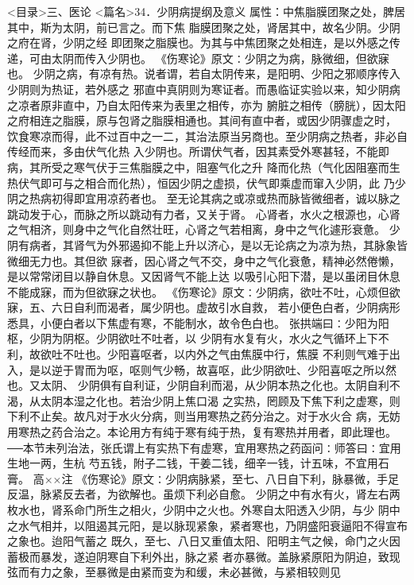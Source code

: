\documentclass[a4paper,12pt,UTF8,twoside]{ctexbook}
\begin{document}
<目录>三、医论
<篇名>34．少阴病提纲及意义
属性：中焦脂膜团聚之处，脾居其中，斯为太阴，前已言之。而下焦 
脂膜团聚之处，肾居其中，故名少阴。少阴之府在肾，少阴之经 
即团聚之脂膜也。为其与中焦团聚之处相连，是以外感之传递，可由太阴而传入少阴也。 
《伤寒论》原文∶少阴之为病，脉微细，但欲寐也。 
少阴之病，有凉有热。说者谓，若自太阴传来，是阳明、少阳之邪顺序传入少阴则为热证，若外感之 
邪直中真阴则为寒证者。而愚临证实验以来，知少阴病之凉者原非直中，乃自太阳传来为表里之相传，亦为 
腑脏之相传（膀胱），因太阳之府相连之脂膜，原与包肾之脂膜相通也。其间有直中者，或因少阴骤虚之时， 
饮食寒凉而得，此不过百中之一二，其治法原当另商也。至少阴病之热者，非必自传经而来，多由伏气化热 
入少阴也。所谓伏气者，因其素受外寒甚轻，不能即病，其所受之寒气伏于三焦脂膜之中，阻塞气化之升 
降而化热（气化因阻塞而生热伏气即可与之相合而化热），恒因少阴之虚损，伏气即乘虚而窜入少阴，此 
乃少阴之热病初得即宜用凉药者也。 
至无论其病之或凉或热而脉皆微细者，诚以脉之跳动发于心，而脉之所以跳动有力者，又关于肾。 
心肾者，水火之根源也，心肾之气相济，则身中之气化自然壮旺，心肾之气若相离，身中之气化遽形衰惫。 
少阴有病者，其肾气为外邪遏抑不能上升以济心，是以无论病之为凉为热，其脉象皆微细无力也。其但欲 
寐者，因心肾之气不交，身中之气化衰惫，精神必然倦懒，是以常常闭目以静自休息。又因肾气不能上达 
以吸引心阳下潜，是以虽闭目休息不能成寐，而为但欲寐之状也。 
《伤寒论》原文∶少阴病，欲吐不吐，心烦但欲寐，五、六日自利而渴者，属少阴也。虚故引水自救， 
若小便色白者，少阴病形悉具，小便白者以下焦虚有寒，不能制水，故令色白也。 
张拱端曰∶少阳为阳枢，少阴为阴枢。少阴欲吐不吐者，以 
少阴有水复有火，水火之气循环上下不利，故欲吐不吐也。少阳喜呕者，以内外之气由焦膜中行，焦膜 
不利则气难于出入，是以逆于胃而为呕，呕则气少畅，故喜呕，此少阴欲吐、少阳喜呕之所以然也。又太阴、 
少阴俱有自利证，少阴自利而渴，从少阴本热之化也。太阴自利不渴，从太阴本湿之化也。若治少阴上焦口渴 
之实热，罔顾及下焦下利之虚寒，则下利不止矣。故凡对于水火分病，则当用寒热之药分治之。对于水火合 
病，无妨用寒热之药合治之。本论用方有纯于寒有纯于热，复有寒热并用者，即此理也。 
──本节未列治法，张氏谓上有实热下有虚寒，宜用寒热之药函问∶师答曰∶宜用生地一两，生杭 
芍五钱，附子二钱，干姜二钱，细辛一钱，计五味，不宜用石膏。 高××注 
《伤寒论》原文∶少阴病脉紧，至七、八日自下利，脉暴微，手足反温，脉紧反去者，为欲解也。虽烦下利必自愈。 
少阴之中有水有火，肾左右两枚水也，肾系命门所生之相火，少阴中之火也。外寒自太阳透入少阴，与少 
阴中之水气相并，以阻遏其元阳，是以脉现紧象，紧者寒也，乃阴盛阳衰逼阳不得宣布之象也。迨阳气蓄之 
既久，至七、八日又重值太阳、阳明主气之候，命门之火因蓄极而暴发，遂迫阴寒自下利外出，脉之紧 
者亦暴微。盖脉紧原阳为阴迫，致现弦而有力之象，至暴微是由紧而变为和缓，未必甚微，与紧相较则见 
\end{document}
